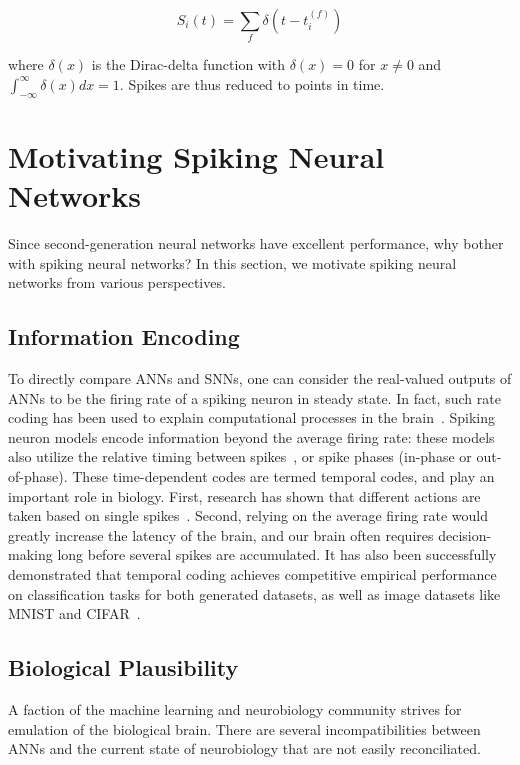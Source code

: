 \documentclass[fyp]{socreport}
\begin{document}
\begin{equation} S_i(t) = \sum_{f} \delta\left( t - t_i^{(f)} \right)
\end{equation}

where \(\delta(x)\) is the Dirac-delta function with \(\delta(x) = 0\) for
\(x \ne 0\) and \(\int_{-\infty}^{\infty} \delta(x)dx = 1\). Spikes are thus
reduced to points in time.

\section{Motivating Spiking Neural Networks\label{sec:motiv-spik-neur}}

Since second-generation neural networks have excellent performance, why bother
with spiking neural networks? In this section, we motivate spiking neural
networks from various perspectives.

\subsection{Information Encoding}

To directly compare ANNs and SNNs, one can consider the real-valued outputs of
ANNs to be the firing rate of a spiking neuron in steady state. In fact, such
rate coding has been used to explain computational processes in the
brain~\cite{pfeiffer2018deep}. Spiking neuron models encode information beyond
the average firing rate: these models also utilize the relative timing between
spikes~\cite{guetig14_to_spike_or_when_to_spike}, or spike phases (in-phase or
out-of-phase). These time-dependent codes are termed temporal codes, and play an
important role in biology. First, research has shown that different actions are
taken based on single spikes~\cite{stemmler96_singl_spike_suffic}. Second,
relying on the average firing rate would greatly increase the latency of the
brain, and our brain often requires decision-making long before several spikes
are accumulated.  It has also been successfully demonstrated that temporal
coding achieves competitive empirical performance on classification tasks for
both generated datasets, as well as image datasets like MNIST and
CIFAR~\cite{comsa19_tempor_codin_spikin_neural_networ}.

\subsection{Biological Plausibility\label{bioplausible}}

A faction of the machine learning and neurobiology community strives for
emulation of the biological brain. There are several incompatibilities between
ANNs and the current state of neurobiology that are not easily reconciliated.
\end{document}
